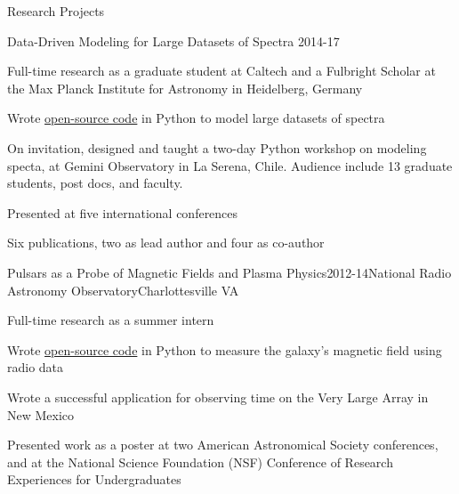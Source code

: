 \documentclass{resume} %
\begin{document}
\begin{rSection}{Research Projects}
  \begin{rSubsection}{Data-Driven Modeling for Large Datasets of Spectra}
    {2014-17}{}{}
  \item 
    Full-time research as a graduate student at Caltech and a Fulbright
    Scholar at the Max Planck Institute for Astronomy in Heidelberg, Germany
  \item
    Wrote \href{https://github.com/annayqho/TheCannon}{open-source code} in Python to model large datasets of spectra
  \item
    On invitation, designed and taught a two-day Python workshop on modeling
    specta, at Gemini Observatory in La Serena, Chile.
    Audience include 13 graduate students, post docs, and faculty.
  \item
    Presented at five international conferences
  \item
    Six publications, two as lead author and four as co-author 
\end{rSubsection}

\begin{rSubsection}{Pulsars as a Probe of Magnetic Fields and Plasma Physics}{2012-14}{National Radio Astronomy Observatory}{Charlottesville VA}
  \item
    Full-time research as a summer intern 
  \item 
    Wrote \href{https://github.com/annayqho/ter5-RMs}{open-source code} in Python to measure the 
    galaxy's magnetic field using radio data
  \item Wrote a successful application for observing time on the 
    Very Large Array in New Mexico
  \item Presented work as a poster at two
    American Astronomical Society conferences,
    and at the National Science Foundation (NSF) Conference of 
    Research Experiences for Undergraduates
\end{rSubsection}

\end{rSection}

\end{document}
